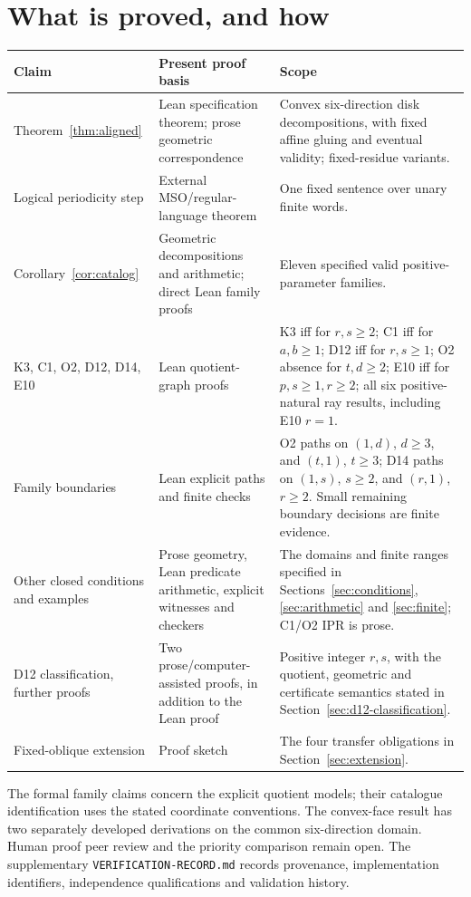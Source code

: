 \documentclass[11pt]{amsart}
\newcommand{\record}[1]{\nolinkurl{#1}}
\theoremstyle{definition}\newtheorem{definition}{Definition}
\begin{document}
\section{What is proved, and how}\label{sec:guarantees}
\begin{center}\small
\begin{tabular}{p{}p{}p{}}
\toprule Claim & Present proof basis & Scope\\\midrule
Theorem~\ref{thm:aligned} & Lean specification theorem; prose geometric correspondence & Convex six-direction disk decompositions, with fixed affine gluing and eventual validity; fixed-residue variants.\\
Logical periodicity step & External MSO/regular-language theorem & One fixed sentence over unary finite words.\\
Corollary~\ref{cor:catalog} & Geometric decompositions and arithmetic; direct Lean family proofs & Eleven specified valid positive-parameter families.\\
K3, C1, O2, D12, D14, E10 & Lean quotient-graph proofs & K3 iff for $r,s\ge2$; C1 iff for $a,b\ge1$; D12 iff for $r,s\ge1$; O2 absence for $t,d\ge2$; E10 iff for $p,s\ge1,r\ge2$; all six positive-natural ray results, including E10 $r=1$.\\
Family boundaries & Lean explicit paths and finite checks & O2 paths on $(1,d)$, $d\ge3$, and $(t,1)$, $t\ge3$; D14 paths on $(1,s)$, $s\ge2$, and $(r,1)$, $r\ge2$. Small remaining boundary decisions are finite evidence.\\
Other closed conditions and examples & Prose geometry, Lean predicate arithmetic, explicit witnesses and checkers & The domains and finite ranges specified in Sections~\ref{sec:conditions}, \ref{sec:arithmetic} and \ref{sec:finite}; C1/O2 IPR is prose.\\
D12 classification, further proofs & Two prose/computer-assisted proofs, in addition to the Lean proof & Positive integer $r,s$, with the quotient, geometric and certificate semantics stated in Section~\ref{sec:d12-classification}.\\
Fixed-oblique extension & Proof sketch & The four transfer obligations in Section~\ref{sec:extension}.\\
\bottomrule
\end{tabular}
\end{center}
The formal family claims concern the explicit quotient models; their
catalogue identification uses the stated coordinate conventions.
The convex-face result has two separately developed derivations on
the common six-direction domain. Human proof peer review and the
priority comparison remain open. The supplementary
\record{VERIFICATION-RECORD.md} records provenance, implementation
identifiers, independence qualifications and validation history.
\end{document}
